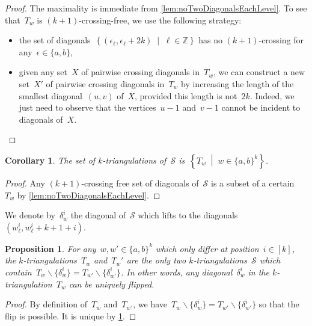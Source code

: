 \documentclass{amsart}
\newtheorem{proposition}[theorem]{Proposition}
\newtheorem{corollary}[theorem]{Corollary}
\theoremstyle{remark}
\newcommand{\Z}{\mathbb{Z}} %
\newcommand{\set}[2]{\left\{ #1 \;\middle|\; #2 \right\}} %
\newcommand{\ssm}{\smallsetminus} %
\newcommand{\surface}{\mathcal{S}}
\begin{document}
\begin{proof}
The maximality is immediate from \cref{lem:noTwoDiagonalsEachLevel}.
To see that~$T_w$ is $(k+1)$-crossing-free, we use the following strategy:
\begin{itemize}
\item the set of diagonals~$\set{(\epsilon_\ell, \epsilon_\ell+2k)}{\ell \in \Z}$ has no $(k+1)$-crossing for any~$\epsilon \in \{a,b\}$,
\item given any set~$X$ of pairwise crossing diagonals in~$T_w$, we can construct a new set~$X'$ of pairwise crossing diagonals in~$T_w$ by increasing the length of the smallest diagonal~$(u,v)$ of~$X$, provided this length is not~$2k$. Indeed, we just need to observe that the vertices~$u-1$ and~$v-1$ cannot be incident to diagonals of~$X$.
\qedhere
\end{itemize}
\end{proof}

\begin{corollary}
\label{coro:allkTriangCyclinder}
The set of $k$-triangulations of~$\surface$ is~$\set{T_w}{w \in \{a,b\}^k}$.
\end{corollary}

\begin{proof}
Any $(k+1)$-crossing free set of diagonals of~$\surface$ is a subset of a certain~$T_w$ by \cref{lem:noTwoDiagonalsEachLevel}.
\end{proof}

We denote by~$\delta_w^i$ the diagonal of~$\surface$ which lifts to the diagonals~$(w^i_\ell, w^i_{\ell}+k+1+i)$.

\begin{proposition}
\label{prop:flip2halfCylinder}
For any~$w, w' \in \{a,b\}^k$ which only differ at position~$i \in [k]$, the $k$-triangulations~$T_w$ and~$T_w'$ are the only two $k$-triangulations~$\surface$ which contain~${T_w \ssm \{\delta_w^i\} = T_{w'} \ssm \{\delta_{w'}^i\}}$. In other words, any diagonal~$\delta_w^i$ in the $k$-triangulation~$T_w$ can be uniquely flipped.
\end{proposition}

\begin{proof}
By definition of~$T_w$ and~$T_{w'}$, we have~${T_w \ssm \{\delta_w^i\} = T_{w'} \ssm \{\delta_{w'}^i\}}$ so that the flip is possible.
It is unique by \cref{coro:allkTriangCyclinder}.
\end{proof}
\end{document}
